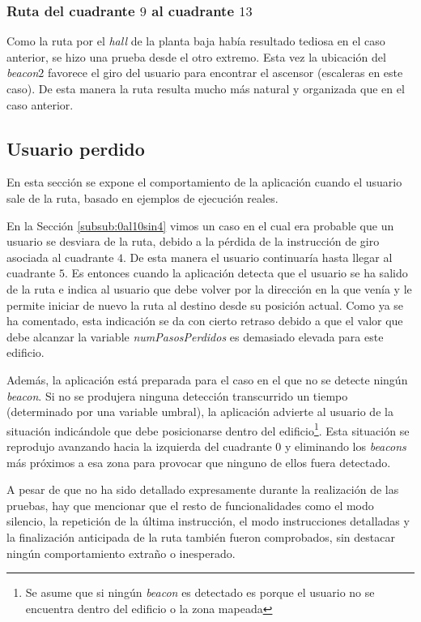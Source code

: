 \subsubsection{Ruta del cuadrante $9$ al cuadrante $13$}
\label{subsub:9al13}

Como la ruta por el \textit{hall} de la planta baja había resultado tediosa en el caso anterior, se hizo una prueba desde el otro extremo. Esta vez la ubicación del \textit{beacon$2$} favorece el giro del usuario para encontrar el ascensor (escaleras en este caso). De esta manera la ruta resulta mucho más natural y organizada que en el caso anterior.

\subsection{Usuario perdido}
\label{sub:usuarioPerdido}

En esta sección se expone el comportamiento de la aplicación cuando el usuario sale de la ruta, basado en ejemplos de ejecución reales. 

En la Sección \ref{subsub:0al10sin4} vimos un caso en el cual era probable que un usuario se desviara de la ruta, debido a la pérdida de la instrucción de giro asociada al cuadrante $4$. De esta manera el usuario continuaría hasta llegar al cuadrante $5$. Es entonces cuando la aplicación detecta que el usuario se ha salido de la ruta e indica al usuario que debe volver por la dirección en la que venía y le permite iniciar de nuevo la ruta al destino desde su posición actual. Como ya se ha comentado, esta indicación se da con cierto retraso debido a que el valor que debe alcanzar la variable \textit{numPasosPerdidos} es demasiado elevada para este edificio. 

Además, la aplicación está preparada para el caso en el que no se detecte ningún \textit{beacon}. Si no se produjera ninguna detección transcurrido un tiempo (determinado por una variable umbral), la aplicación advierte al usuario de la situación indicándole que debe posicionarse dentro del edificio\footnote{Se asume que si ningún \textit{beacon} es detectado es porque el usuario no se encuentra dentro del edificio o la zona mapeada}. Esta situación se reprodujo avanzando hacia la izquierda del cuadrante $0$ y eliminando los \textit{beacons} más próximos a esa zona para provocar que ninguno de ellos fuera detectado.

A pesar de que no ha sido detallado expresamente durante la realización de las pruebas, hay que mencionar que el resto de funcionalidades como el modo silencio, la repetición de la última instrucción, el modo instrucciones detalladas y la finalización anticipada de la ruta también fueron comprobados, sin destacar ningún comportamiento extraño o inesperado.

